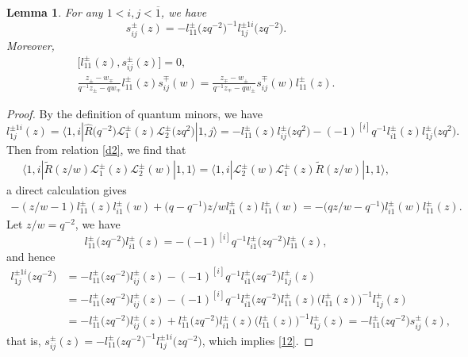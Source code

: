 \documentclass[pdftex]{sigma}
\numberwithin{equation}{section}
\newtheorem{Lemma}[Theorem]{Lemma}
\begin{document}
\begin{Lemma}\label{le1}
For any $1<i,j <\overline{1}$, we have
\begin{equation}\label{12}
 s^{\pm}_{ij}(z)=- l_{11}^{\pm}\bigl(zq^{-2}\bigr)^{-1}l^{\pm 1i}_{1j}\bigl(zq^{-2}\bigr).
\end{equation}Moreover,
\begin{gather}\label{13}
 \bigl[l_{11}^{\pm}(z),s^{\pm}_{ij}(z)\bigr]=0, \\
 \label{14}
 \frac{z_{\pm}-w_{\mp}}{q^{-1}z_{\pm}-qw_{\mp}}l_{11}^{\pm}(z)s^{\mp}_{ij}(w)=\frac{z_{\mp}
 -w_{\pm}}{q^{-1}z_{\mp}-qw_{\pm}}s^{\mp}_{ij}(w)l_{11}^{\pm}(z).
\end{gather}
\end{Lemma}
\begin{proof}
By the definition of quantum minors, we have
\begin{equation*}
 l^{\pm 1i}_{1j}(z)=\big\langle 1, i|\widehat{R}\bigl(q^{-2}\bigr)\mathcal{L}_1^{\pm}(z)\mathcal{L}_2^{\pm}\bigl(zq^2\bigr)|1, j\big\rangle=-l_{11}^{\pm}(z)l_{ij}^{\pm}\bigl(zq^{2}\bigr)-(-1)^{[i]}q^{-1}l_{i1}^{\pm}(z)l_{1j}^{\pm}\bigl(zq^{2}\bigr).
\end{equation*}
Then from relation \eqref{d2}, we find that
\begin{gather*}
\big\langle 1, i|\widetilde{R}(z/w)\mathcal{L}_1^{\pm}(z)\mathcal{L}_2^{\pm}(w)|1, 1\big\rangle=\big\langle 1, i|\mathcal{L}_2^{\pm}(w)\mathcal{L}_1^{\pm}(z)\widetilde{R}(z/w)|1, 1\big\rangle,
\end{gather*}
a direct calculation gives
\begin{gather*}
 -(z/w-1)l_{11}^{\pm}(z)l_{i1}^{\pm}(w)+\bigl(q-q^{-1}\bigr)z/wl_{i1}^{\pm}(z)l_{11}^{\pm}(w)=-\bigl(qz/w-q^{-1}\bigr)l_{i1}^{\pm}(w)l_{11}^{\pm}(z).
\end{gather*}
Let $z/w=q^{-2}$, we have
\begin{equation*}
 l_{11}^{\pm}\bigl(zq^{-2}\bigr)l_{i1}^{\pm}(z)=-(-1)^{[i]}q^{-1}l_{i1}^{\pm}\bigl(zq^{-2}\bigr)l_{11}^{\pm}(z),
\end{equation*}
and hence
\begin{align*}
 l^{\pm 1i}_{1j}\bigl(zq^{-2}\bigr)&=-l_{11}^{\pm}\bigl(zq^{-2}\bigr)l_{ij}^{\pm}(z)-(-1)^{[i]}q^{-1}l_{i1}^{\pm}\bigl(zq^{-2}\bigr)l_{1j}^{\pm}(z) \\
 &=-l_{11}^{\pm}\bigl(zq^{-2}\bigr)l_{ij}^{\pm}(z)-(-1)^{[i]}q^{-1}l_{i1}^{\pm}\bigl(zq^{-2}\bigr)l_{11}^{\pm}(z)\bigl(l_{11}^{\pm}(z)\bigr)^{-1}l_{1j}^{\pm}(z)\\
 &=-l_{11}^{\pm}\bigl(zq^{-2}\bigr)l_{ij}^{\pm}(z)+l_{11}^{\pm}\bigl(zq^{-2}\bigr)l_{i1}^{\pm}(z)\bigl(l_{11}^{\pm}(z)\bigr)^{-1}l_{1j}^{\pm}(z)=-l_{11}^{\pm}\bigl(zq^{-2}\bigr)s^{\pm}_{ij}(z),
\end{align*}
that is, $s^{\pm}_{ij}(z)=- l_{11}^{\pm}\bigl(zq^{-2}\bigr)^{-1}l^{\pm 1i}_{1j}\bigl(zq^{-2}\bigr)$,
which implies \eqref{12}.


\end{proof}
\end{document}
